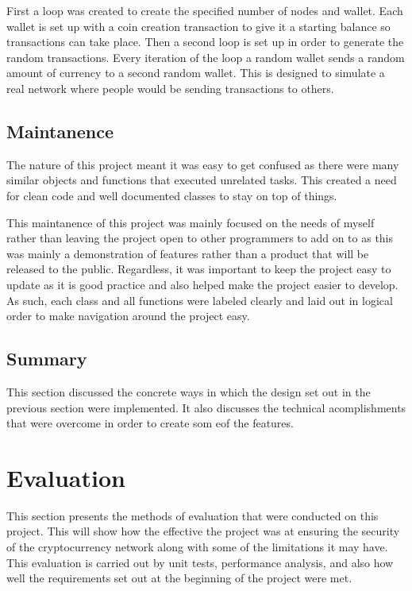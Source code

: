 \documentclass{l4proj}
\begin{document}
First a loop was created to create the specified number of nodes and wallet. Each wallet is set up with a coin
creation transaction to give it a starting balance so transactions can take place. Then a second loop is set up
in order to generate the random transactions. Every iteration of the loop a random wallet sends a random amount
of currency to a second random wallet. This is designed to simulate a real network where people would be sending
transactions to others.



\section{Maintanence}
The nature of this project meant it was easy to get confused as there were many similar objects and functions 
that executed unrelated tasks. This created a need for clean code and well documented classes to stay on top 
of things.

This maintanence of this project was mainly focused on the needs of myself rather than leaving the project open
to other programmers to add on to as this was mainly a demonstration of features rather than a product that will
be released to the public. Regardless, it was important to keep the project easy to update as it is good practice
and also helped make the project easier to develop. As such, each class and all functions were labeled clearly
and laid out in logical order to make navigation around the project easy.

\section{Summary}
This section discussed the concrete ways in which the design set out in the previous section were implemented.
It also discusses the technical acomplishments that were overcome in order to create som eof the features.

\chapter{Evaluation} 
This section presents the methods of evaluation that were conducted on this project. This will show how the effective the
project was at ensuring the security of the cryptocurrency network along with some of the limitations it may have. 
This evaluation is carried out by unit tests, performance analysis, and also how well the requirements set out at 
the beginning of the project were met.
\end{document}
